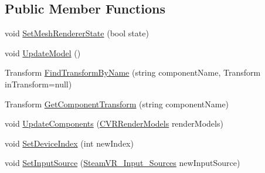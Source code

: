 \subsection*{Public Member Functions}
\begin{DoxyCompactItemize}
\item 
void \mbox{\hyperlink{class_valve_1_1_v_r_1_1_steam_v_r___render_model_a251a4e0e082f7e54e6976ac0f2beb16c}{Set\+Mesh\+Renderer\+State}} (bool state)
\item 
void \mbox{\hyperlink{class_valve_1_1_v_r_1_1_steam_v_r___render_model_a59d9e165c3b79e6d820cd08c4c33a6c3}{Update\+Model}} ()
\item 
Transform \mbox{\hyperlink{class_valve_1_1_v_r_1_1_steam_v_r___render_model_a5d384d5496846ec32181563e7d5ff7ce}{Find\+Transform\+By\+Name}} (string component\+Name, Transform in\+Transform=null)
\item 
Transform \mbox{\hyperlink{class_valve_1_1_v_r_1_1_steam_v_r___render_model_ae233582d690bd1989ecdc19a064d5ff5}{Get\+Component\+Transform}} (string component\+Name)
\item 
void \mbox{\hyperlink{class_valve_1_1_v_r_1_1_steam_v_r___render_model_a4fec96fa73075ae8c809bfeaa6c95aab}{Update\+Components}} (\mbox{\hyperlink{class_valve_1_1_v_r_1_1_c_v_r_render_models}{C\+V\+R\+Render\+Models}} render\+Models)
\item 
void \mbox{\hyperlink{class_valve_1_1_v_r_1_1_steam_v_r___render_model_a0d60fefa83b15ba80676f55753f89274}{Set\+Device\+Index}} (int new\+Index)
\item 
void \mbox{\hyperlink{class_valve_1_1_v_r_1_1_steam_v_r___render_model_a56179c580285575841d60ae39e5685d3}{Set\+Input\+Source}} (\mbox{\hyperlink{namespace_valve_1_1_v_r_a82e5bf501cc3aa155444ee3f0662853f}{Steam\+V\+R\+\_\+\+Input\+\_\+\+Sources}} new\+Input\+Source)
\end{DoxyCompactItemize}
